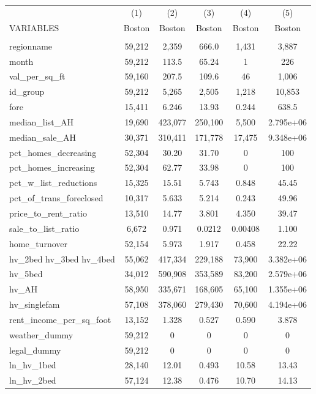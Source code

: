 \begin{tabular}{lccccc} \hline
 & (1) & (2) & (3) & (4) & (5) \\
VARIABLES & Boston & Boston & Boston & Boston & Boston \\ \hline
 &  &  &  &  &  \\
regionname & 59,212 & 2,359 & 666.0 & 1,431 & 3,887 \\
month & 59,212 & 113.5 & 65.24 & 1 & 226 \\
val\_per\_sq\_ft & 59,160 & 207.5 & 109.6 & 46 & 1,006 \\
id\_group & 59,212 & 5,265 & 2,505 & 1,218 & 10,853 \\
fore & 15,411 & 6.246 & 13.93 & 0.244 & 638.5 \\
median\_list\_AH & 19,690 & 423,077 & 250,100 & 5,500 & 2.795e+06 \\
median\_sale\_AH & 30,371 & 310,411 & 171,778 & 17,475 & 9.348e+06 \\
pct\_homes\_decreasing & 52,304 & 30.20 & 31.70 & 0 & 100 \\
pct\_homes\_increasing & 52,304 & 62.77 & 33.98 & 0 & 100 \\
pct\_w\_list\_reductions & 15,325 & 15.51 & 5.743 & 0.848 & 45.45 \\
pct\_of\_trans\_foreclosed & 10,317 & 5.633 & 5.214 & 0.243 & 49.96 \\
price\_to\_rent\_ratio & 13,510 & 14.77 & 3.801 & 4.350 & 39.47 \\
sale\_to\_list\_ratio & 6,672 & 0.971 & 0.0212 & 0.00408 & 1.100 \\
home\_turnover & 52,154 & 5.973 & 1.917 & 0.458 & 22.22 \\
hv\_2bed 
hv\_3bed 
hv\_4bed & 55,062 & 417,334 & 229,188 & 73,900 & 3.382e+06 \\
hv\_5bed & 34,012 & 590,908 & 353,589 & 83,200 & 2.579e+06 \\
hv\_AH & 58,950 & 335,671 & 168,605 & 65,100 & 1.355e+06 \\
hv\_singlefam & 57,108 & 378,060 & 279,430 & 70,600 & 4.194e+06 \\
rent\_income\_per\_sq\_foot & 13,152 & 1.328 & 0.527 & 0.590 & 3.878 \\
weather\_dummy & 59,212 & 0 & 0 & 0 & 0 \\
legal\_dummy & 59,212 & 0 & 0 & 0 & 0 \\
ln\_hv\_1bed & 28,140 & 12.01 & 0.493 & 10.58 & 13.43 \\
ln\_hv\_2bed & 57,124 & 12.38 & 0.476 & 10.70 & 14.13 \\

\end{tabular}
